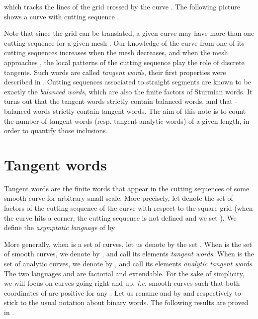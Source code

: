 \documentclass[preliminary]{eptcs}
\begin{document}
which tracks the lines of the grid crossed by the curve .
\newline
The following picture shows a curve  with cutting sequence
.
\begin{center}


\end{center}
Note that since the grid can be translated, a given curve may have more
than one cutting sequence for a given mesh .
Our knowledge of the curve from one of its cutting sequences increases
when the mesh  decreases, and when the mesh approaches , the local
patterns of the cutting sequence play the role of discrete tangents. Such
words are called \emph{tangent words}, their first properties were
described in \cite{MonteilDGCI2011}.
Cutting sequences associated to straight segments are known to be exactly
the \emph{balanced words}, which are also the finite factors of Sturmian
words.
It turns out that the tangent words strictly contain balanced words, and
that -balanced words strictly contain tangent words. The aim of this
note is to count the number of tangent words (resp. tangent analytic
words) of a given length, in order to quantify those inclusions.






\section{Tangent words}
Tangent words are the finite words that appear in the cutting sequences of
some smooth curve for arbitrary small scale.
More precisely, let  denote the set of factors of the cutting
sequence of the curve  with respect to the square grid  (when
the curve hits a corner, the cutting sequence is not defined and we set
).
We define the \emph{asymptotic language} of  by

More generally, when  is a set of curves, let us denote by  the
set . When  is the set of smooth
curves, we denote  by , and call its elements
\emph{tangent words}. When  is the set of analytic curves, we denote
 by , and call its elements \emph{analytic tangent words}.
The two languages  and  are factorial and extendable.
\newline \newline
For the sake of simplicity, we will focus on curves going right and up,
\emph{i.e.} smooth curves such that both coordinates of  are
positive for any . Let us rename  and  by  and 
respectively to stick to the usual notation about binary words.
\newline \newline
The following results are proved in \cite{MonteilDGCI2011}.
\end{document}
